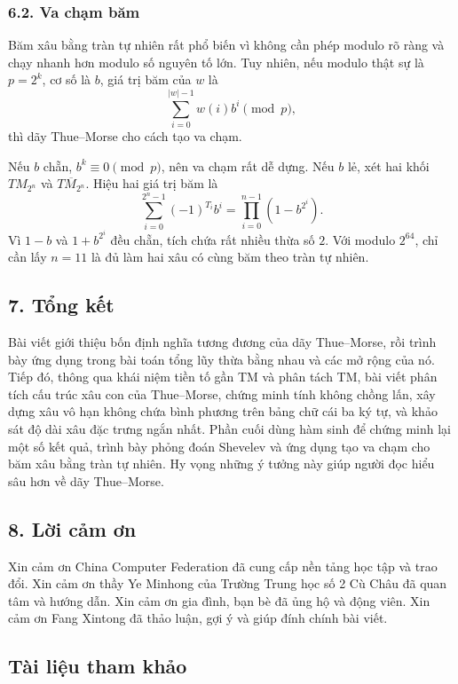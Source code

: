 \documentclass[11pt]{article}
\begin{document}
\subsubsection*{6.2. Va chạm băm}

Băm xâu bằng tràn tự nhiên rất phổ biến vì không cần phép modulo rõ ràng và
chạy nhanh hơn modulo số nguyên tố lớn. Tuy nhiên, nếu modulo thật sự là
\(p=2^k\), cơ số là \(b\), giá trị băm của \(w\) là
\[
  \sum_{i=0}^{|w|-1}w(i)b^i \pmod p,
\]
thì dãy Thue--Morse cho cách tạo va chạm.

Nếu \(b\) chẵn, \(b^k\equiv0\pmod p\), nên va chạm rất dễ dựng. Nếu \(b\) lẻ,
xét hai khối \(TM_{2^n}\) và \(\overline{TM_{2^n}}\). Hiệu hai giá trị băm là
\[
  \sum_{i=0}^{2^n-1}(-1)^{T_i}b^i
  =\prod_{i=0}^{n-1}(1-b^{2^i}).
\]
Vì \(1-b\) và \(1+b^{2^i}\) đều chẵn, tích chứa rất nhiều thừa số \(2\). Với
modulo \(2^{64}\), chỉ cần lấy \(n=11\) là đủ làm hai xâu có cùng băm theo
tràn tự nhiên.

\subsection*{7. Tổng kết}

Bài viết giới thiệu bốn định nghĩa tương đương của dãy Thue--Morse, rồi trình
bày ứng dụng trong bài toán tổng lũy thừa bằng nhau và các mở rộng của nó. Tiếp
đó, thông qua khái niệm tiền tố gần TM và phân tách TM, bài viết phân tích cấu
trúc xâu con của Thue--Morse, chứng minh tính không chồng lấn, xây dựng xâu vô
hạn không chứa bình phương trên bảng chữ cái ba ký tự, và khảo sát độ dài xâu
đặc trưng ngắn nhất. Phần cuối dùng hàm sinh để chứng minh lại một số kết quả,
trình bày phỏng đoán Shevelev và ứng dụng tạo va chạm cho băm xâu bằng tràn tự
nhiên. Hy vọng những ý tưởng này giúp người đọc hiểu sâu hơn về dãy
Thue--Morse.

\subsection*{8. Lời cảm ơn}

Xin cảm ơn China Computer Federation đã cung cấp nền tảng học tập và trao đổi.
Xin cảm ơn thầy Ye Minhong của Trường Trung học số 2 Cù Châu đã quan tâm và
hướng dẫn. Xin cảm ơn gia đình, bạn bè đã ủng hộ và động viên. Xin cảm ơn Fang
Xintong đã thảo luận, gợi ý và giúp đính chính bài viết.

\subsection*{Tài liệu tham khảo}
\end{document}
